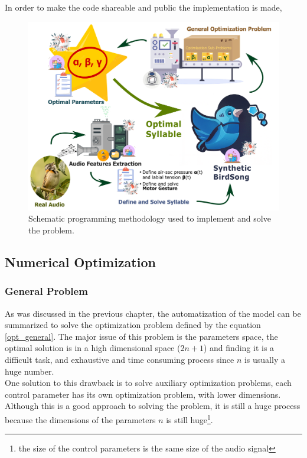 In order to make the code shareable and public the implementation is made, 

\begin{figure}[H]
    \centering
    \includegraphics[width=\linewidth]{Images/methodology.png}
    \caption{Schematic programming methodology used to implement and solve the problem.}
    \label{fig:methodology}
\end{figure}



\subsection{Numerical Optimization}

\subsubsection{General Problem}

As was discussed in the previous chapter, the automatization of the model can be summarized to solve the optimization problem defined by the equation \eqref{opt_general}. The major issue of this problem is the parameters space, the optimal solution is in a high dimensional space ($2n+1$) and finding it is a difficult task, and exhaustive and time consuming process since $n$ is usually a huge number. \\

One solution to this drawback is to solve auxiliary optimization problems, each control parameter has its own optimization problem, with lower dimensions. Although this is a good approach to solving the problem, it is still a huge process because the dimensions of the parameters $n$ is still huge\footnote{the size of the control parameters is the same size of the audio signal}.

